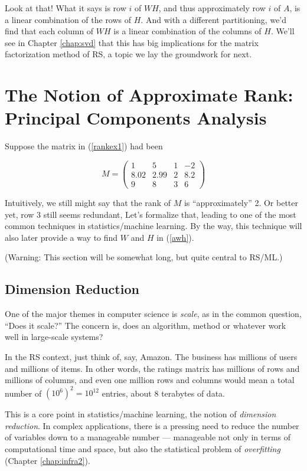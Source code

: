 Look at that!  What it says is row $i$ of $WH$, and thus approximately
row $i$ of $A$, is a linear combination of the rows of $H$.  And with a
different partitioning, we'd find that each column of $WH$ is a linear
combination of the columns of $H$.  We'll see in Chapter \ref{chap:svd}
that this has big implications for the matrix factorization method of
RS, a topic we lay the groundwork for next.

\section{The Notion of Approximate Rank:  Principal Components
Analysis}

Suppose the matrix in (\ref{rankex1}) had been

\begin{equation}
\label{rankex2}
M =
\left (
\begin{array}{rrrr}
1 & 5 & 1 & -2\\
8.02 & 2.99 & 2 & 8.2\\
9 & 8 & 3 & 6 
\end{array}
\right )
\end{equation}

Intuitively, we still might say that the rank of $M$ is
``approximately'' 2.  Or better yet, row 3 still seems redundant, Let's
formalize that, leading to one of the most common techniques in
statistics/machine learning.  By the way, this technique will also later
provide a way to find $W$ and $H$ in (\ref{awh}).

(Warning:  This section will be somewhat long, but quite central to
RS/ML.)

\subsection{Dimension Reduction}

One of the major themes in computer science is \textit{scale}, as in the
common question, ``Does it scale?''  The concern is, does an algorithm,
method or whatever work well in large-scale systems?

In the RS context, just think of, say, Amazon.  The business has
millions of users and millions of items.  In other words, the ratings
matrix has millions of rows and millions of columns, and even one
million rows and columns would mean a total number of $(10^6)^2 =
10^{12}$ entries, about 8 terabytes of data.

This is a core point in statistics/machine learning, the notion of
\textit{dimension reduction}.  In complex applications, there is a
pressing need to reduce the number of variables down to a 
manageable number --- manageable not only in terms of computational time
and space, but also the statistical problem of \textit{overfitting}
(Chapter \ref{chap:infra2}).

